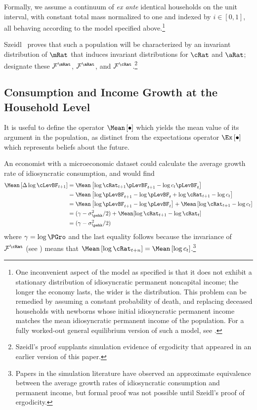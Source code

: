 \documentclass[./BufferStockTheory.tex]{subfiles}
\begin{document}
Formally, we assume a continuum of {\it ex ante} identical households
on the unit interval, with constant total mass normalized to one and
indexed by $i \in [0,1]$, all behaving according to the model
specified above.\footnote{One inconvenient aspect of the model as
  specified is that it does not exhibit a stationary distribution of
  idiosyncratic permanent noncapital income; the longer the economy lasts, the wider is the
  distribution.  This problem can be remedied by assuming a constant
  probability of death, and replacing deceased households with
  newborns whose initial idiosyncratic permanent income matches the
  mean idiosyncratic permanent income of the population.  For a fully
  worked-out general equilibrium version of such a model, see \cite{BSinKS}.}

Szeidl~\citeyearpar{szeidlInvariant} proves that such a
population will be characterized by an invariant
distribution of $\mRat$ that induces invariant distributions for $\cRat$ and
$\aRat$; designate these $\mathcal{F}^{\mRat}$, $\mathcal{F}^{\aRat}$, and
$\mathcal{F}^{\cRat}$.\footnote{Szeidl's proof supplants simulation evidence of ergodicity
that appeared in an earlier version of this paper.}


\hypertarget{Consumption-and-Income-Growth-at-the-Household-Level}{}
\subsection{Consumption and Income Growth at the Household Level}

It is useful to define the operator $\Mean\left[\bullet\right]$
which yields the mean value of its argument in the population, as
distinct from the expectations operator $\Ex\left[\bullet\right]$ which represents beliefs about the
future.

An economist with a microeconomic dataset could calculate the average
growth rate of idiosyncratic consumption, and would find
\begin{align*}
\Mean\left[\Delta \log \cLevBF_{t+1}\right]  & = \Mean\left[ \log {\cRat}_{t+1}\pLevBF_{t+1} - \log c_{t}\pLevBF_{t}\right]  \notag \\
 & = \Mean\left[ \log \pLevBF_{t+1}- \log \pLevBF_{t} + \log {\cRat}_{t+1} - \log c_{t}\right]  \notag \\
 & = \Mean\left[ \log \pLevBF_{t+1}- \log \pLevBF_{t}\right] + \Mean\left[ \log {\cRat}_{t+1} - \log c_{t}\right]  \notag \\
 & = (\gamma - \sigma^{2}_{\pshk}/2) + \Mean[\log \cRat_{t+1} - \log \cRat_{t}] \\
 & = (\gamma - \sigma^{2}_{\pshk}/2)
\end{align*}
where $\gamma=\log \PGro$ and the last equality follows because the invariance of
$\mathcal{F}^{\cRat}$ (see \cite{szeidlInvariant}) means that $\Mean\left[ \log
  {\cRat}_{t+n}\right] = \Mean\left[ \log
  c_{t}\right]$.\footnote{Papers in the simulation literature have
  observed an approximate equivalence between the average growth rates
  of idiosyncratic consumption and permanent income, but formal proof
  was not possible until Szeidl's proof of ergodicity.}
\end{document}

